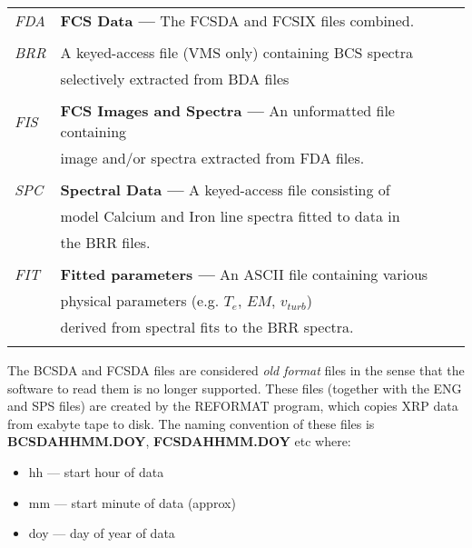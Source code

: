 \begin{center}
\begin{tabular}{||l l||}
 {\em FDA} & {\bf FCS Data ---} The FCSDA and FCSIX files combined. \\
                         &                             \\

 {\em BRR} &    A keyed-access file (VMS only) containing BCS spectra \\
                         &  selectively extracted from BDA files \\
                         &  \\

 {\em FIS} & {\bf FCS Images and Spectra ---} An unformatted file containing \\
                         & image and/or spectra extracted from FDA files.\\
                         &                             \\

 {\em SPC} & {\bf Spectral Data ---} A keyed-access file consisting of\\
                         & model Calcium and Iron line spectra fitted to data in\\
                         & the BRR files. \\
                         &                             \\

 {\em FIT} & {\bf Fitted parameters ---} An ASCII file containing various \\
                        & physical parameters (e.g. $T_e$, $EM$, $v_{turb}$) \\
                         & derived from spectral fits to the BRR spectra. \\
                         &                             \\
\hline
\end{tabular}
\end{center}

\newpage

The BCSDA and FCSDA files are considered {\it old format} files in the sense
that the software to read them is no longer supported. These files (together
with the ENG and SPS files)  are created by the REFORMAT program, which copies
XRP data from exabyte tape to disk.  The naming convention of these files is
{\bf BCSDAHHMM.DOY}, {\bf FCSDAHHMM.DOY} etc where:

\begin{itemize}
\item     hh  --- start hour of data
\item     mm  --- start minute of data (approx)
\item     doy --- day of year of data
\end{itemize}


